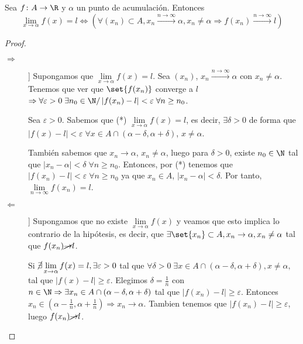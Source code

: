 \begin{proposition}
	\label{caractsuc}
	Sea \(f \colon A \to \R \) y \(\alpha\) un punto de acumulación. Entonces
	\[
		\lim\limits_{x  \to \alpha} f(x) = l \iff (\forall (x_n) \subset A, x_n \overset{n \rightarrow \infty}{\longrightarrow} \alpha, x_n \neq \alpha \Rightarrow f(x_n) \overset{n\rightarrow \infty}{\longrightarrow} l)
	\]
\end{proposition}
\begin{proof}
	\begin{description}
		\item[\(\Rightarrow \)]] Supongamos que \(\lim\limits_{x  \to \alpha} f(x) = l  \). Sea \((x_n )\), \(x_n \overset{n \rightarrow \infty}{\longrightarrow} \alpha \) con \(x_n \neq \alpha\). Tenemos que ver que \(\set{f(x_n )}\) converge a \(l \) \(\Rightarrow \forall \varepsilon > 0 \; \exists n_0 \in \N / \left\vert f(x_n) - l \right\vert < \varepsilon \; \forall n \geq n_0 \).

		Sea \(\varepsilon > 0 \). Sabemos que (*) \(\lim\limits_{x  \to \alpha} f(x) = l \), es decir, \(\exists \delta > 0 \) de forma que \(\left\vert f(x) - l  \right\vert < \varepsilon \; \forall x \in A \cap (\alpha - \delta, \alpha + \delta)\), \(x \neq \alpha\).

		También sabemos que \(x_n \rightarrow \alpha\), \(x_n \neq \alpha\), luego para \(\delta > 0 \), existe \(n_0 \in \N \) tal que \(\left\vert x_n - \alpha \right\vert < \delta \; \forall n \geq n_0\). Entonces, por (*) tenemos que \(\left\vert f(x_n) - l  \right\vert < \varepsilon \; \forall n \geq n_0\) ya que \(x_n \in A \), \(\left\vert x_n - \alpha \right\vert < \delta\). Por tanto, \(\lim\limits_{n  \to \infty} f(x_n) = l\).

		\item[\(\Leftarrow \)]] Supongamos que no existe \(\lim\limits_{x \to \alpha} f(x)\) y veamos que esto implica lo contrario de la hipótesis, es decir, que \(\exists \set{x_n } \subset A, x_n \rightarrow \alpha, x_n \neq \alpha\) tal que \(f(x_n) \cancel \rightarrow l \).

		Si \(\cancel \exists \lim\limits_{x  \to \alpha} f(x) = l , \exists \varepsilon > 0  \) tal que \(\forall \delta > 0 \; \exists x \in A \cap (\alpha - \delta, \alpha + \delta), x \neq \alpha,\) tal que \(\left\vert f(x) - l \right\vert \geq \varepsilon\). Elegimos \(\delta = \frac{1}{n }\) con \(n \in \N  \Rightarrow \exists x_n \in A \cap (\alpha - \delta, \alpha + \delta)\) tal que \(\left\vert f(x_n) - l  \right\vert \geq \varepsilon\). Entonces \(x_n \in (\alpha - \frac{1}{n}, \alpha + \frac{1}{n}) \Rightarrow x_n \rightarrow \alpha\). Tambien tenemos que \(\left\vert f(x_n) - l  \right\vert \geq \varepsilon\), luego \(f(x_n) \cancel \rightarrow l \).
	\end{description}
\end{proof}

